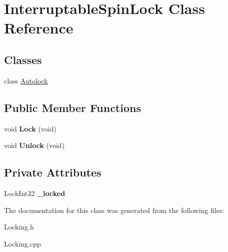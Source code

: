 \hypertarget{class_interruptable_spin_lock}{}\section{Interruptable\+Spin\+Lock Class Reference}
\label{class_interruptable_spin_lock}
\subsection*{Classes}
\begin{DoxyCompactItemize}
\item 
class \hyperlink{class_interruptable_spin_lock_1_1_autolock}{Autolock}
\end{DoxyCompactItemize}
\subsection*{Public Member Functions}
\begin{DoxyCompactItemize}
\item 
\mbox{\label{class_interruptable_spin_lock_a4eb5e8fd2db8b2660aea940535a6e526}} 
void {\bfseries Lock} (void)
\item 
\mbox{\label{class_interruptable_spin_lock_aefa7a43a08633755adaec3a7d4c87e01}} 
void {\bfseries Unlock} (void)
\end{DoxyCompactItemize}
\subsection*{Private Attributes}
\begin{DoxyCompactItemize}
\item 
\mbox{\label{class_interruptable_spin_lock_a6a9dc2a9067ff667c97a68dd21575cf5}} 
Lock\+Int32 {\bfseries \+\_\+locked}
\end{DoxyCompactItemize}


The documentation for this class was generated from the following files\+:\begin{DoxyCompactItemize}
\item 
Locking.\+h\item 
Locking.\+cpp\end{DoxyCompactItemize}

